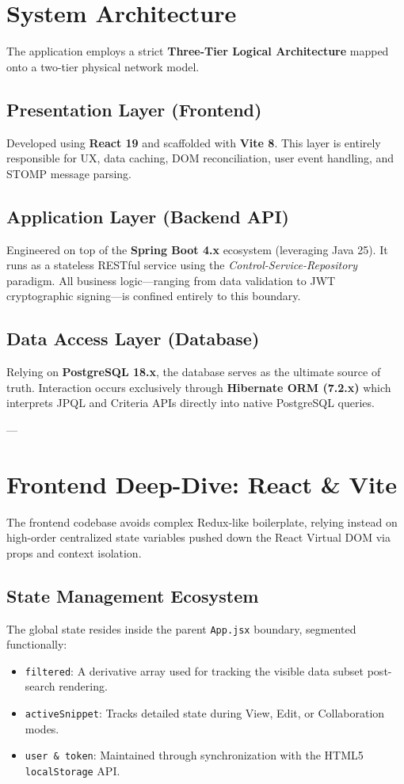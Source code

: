 \documentclass[12pt,a4paper]{article}
\begin{document}
\section{System Architecture}
The application employs a strict \textbf{Three-Tier Logical Architecture} mapped onto a two-tier physical network model.

\subsection{Presentation Layer (Frontend)}
Developed using \textbf{React 19} and scaffolded with \textbf{Vite 8}. This layer is entirely responsible for UX, data caching, DOM reconciliation, user event handling, and STOMP message parsing.

\subsection{Application Layer (Backend API)}
Engineered on top of the \textbf{Spring Boot 4.x} ecosystem (leveraging Java 25).
It runs as a stateless RESTful service using the \textit{Control-Service-Repository} paradigm. All business logic—ranging from data validation to JWT cryptographic signing—is confined entirely to this boundary.

\subsection{Data Access Layer (Database)}
Relying on \textbf{PostgreSQL 18.x}, the database serves as the ultimate source of truth. Interaction occurs exclusively through \textbf{Hibernate ORM (7.2.x)} which interprets JPQL and Criteria APIs directly into native PostgreSQL queries.

---

\section{Frontend Deep-Dive: React \& Vite}
The frontend codebase avoids complex Redux-like boilerplate, relying instead on high-order centralized state variables pushed down the React Virtual DOM via props and context isolation.

\subsection{State Management Ecosystem}
The global state resides inside the parent \texttt{App.jsx} boundary, segmented functionally:
\begin{itemize}
    \item \texttt{filtered}: A derivative array used for tracking the visible data subset post-search rendering.
    \item \texttt{activeSnippet}: Tracks detailed state during View, Edit, or Collaboration modes.
    \item \texttt{user \& token}: Maintained through synchronization with the HTML5 \texttt{localStorage} API.
\end{itemize}
\end{document}
